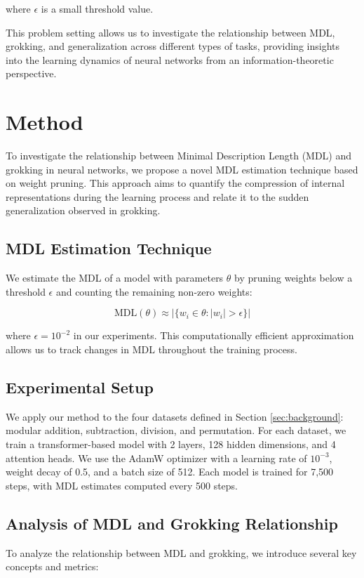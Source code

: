 \documentclass{article} %
\begin{document}
where $\epsilon$ is a small threshold value.

This problem setting allows us to investigate the relationship between MDL, grokking, and generalization across different types of tasks, providing insights into the learning dynamics of neural networks from an information-theoretic perspective.

\section{Method}
\label{sec:method}

To investigate the relationship between Minimal Description Length (MDL) and grokking in neural networks, we propose a novel MDL estimation technique based on weight pruning. This approach aims to quantify the compression of internal representations during the learning process and relate it to the sudden generalization observed in grokking.

\subsection{MDL Estimation Technique}
We estimate the MDL of a model with parameters $\theta$ by pruning weights below a threshold $\epsilon$ and counting the remaining non-zero weights:

\begin{equation}
    \text{MDL}(\theta) \approx |\{w_i \in \theta : |w_i| > \epsilon\}|
\end{equation}

where $\epsilon = 10^{-2}$ in our experiments. This computationally efficient approximation allows us to track changes in MDL throughout the training process.

\subsection{Experimental Setup}
We apply our method to the four datasets defined in Section \ref{sec:background}: modular addition, subtraction, division, and permutation. For each dataset, we train a transformer-based model \cite{vaswani2017attention} with 2 layers, 128 hidden dimensions, and 4 attention heads. We use the AdamW optimizer \cite{loshchilov2017adamw} with a learning rate of $10^{-3}$, weight decay of 0.5, and a batch size of 512. Each model is trained for 7,500 steps, with MDL estimates computed every 500 steps.

\subsection{Analysis of MDL and Grokking Relationship}
To analyze the relationship between MDL and grokking, we introduce several key concepts and metrics:
\end{document}
